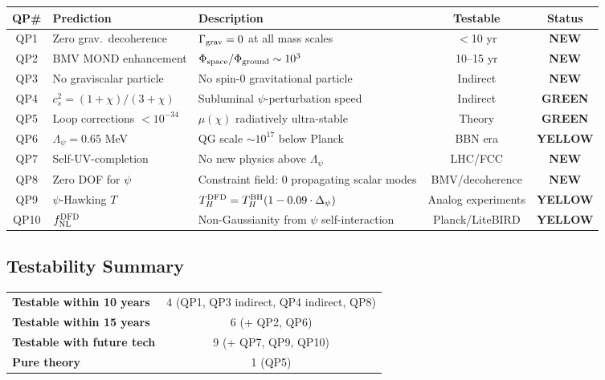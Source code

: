 \documentclass[11pt,a4paper]{article}
\newcommand{\GREEN}{\textcolor{dfdgreen}{\textbf{GREEN}}}
\newcommand{\YELLOW}{\textcolor{dfdyellow}{\textbf{YELLOW}}}
\newcommand{\NEW}{\textcolor{dfdblue}{\textbf{NEW}}}
\begin{document}
\begin{center}
\begin{longtable}{clp{4.5cm}cc}
\toprule
\textbf{QP\#} & \textbf{Prediction} & \textbf{Description} & \textbf{Testable} & \textbf{Status} \\
\midrule
\endfirsthead
QP1 & Zero grav.\ decoherence & $\Gamma_{\rm grav} = 0$ at all mass scales & $<$10 yr & \NEW \\
QP2 & BMV MOND enhancement & $\Phi_{\rm space}/\Phi_{\rm ground} \sim 10^3$ & 10--15 yr & \NEW \\
QP3 & No graviscalar particle & No spin-0 gravitational particle & Indirect & \NEW \\
QP4 & $c_s^2 = (1+\chi)/(3+\chi)$ & Subluminal $\psi$-perturbation speed & Indirect & \GREEN \\
QP5 & Loop corrections $< 10^{-34}$ & $\mu(\chi)$ radiatively ultra-stable & Theory & \GREEN \\
QP6 & $\Lambda_\psi = 0.65$ MeV & QG scale $\sim 10^{17}$ below Planck & BBN era & \YELLOW \\
QP7 & Self-UV-completion & No new physics above $\Lambda_\psi$ & LHC/FCC & \NEW \\
QP8 & Zero DOF for $\psi$ & Constraint field: 0 propagating scalar modes & BMV/decoherence & \NEW \\
QP9 & $\psi$-Hawking $T$ & $T_H^{\rm DFD} = T_H^{\rm BH}(1 - 0.09\cdot\Delta_\psi)$ & Analog experiments & \YELLOW \\
QP10 & $f_{\rm NL}^{\rm DFD}$ & Non-Gaussianity from $\psi$ self-interaction & Planck/LiteBIRD & \YELLOW \\
\bottomrule
\end{longtable}
\end{center}

\subsection{Testability Summary}

\begin{center}
\begin{tabular}{lc}
\toprule
\textbf{Testable within 10 years} & 4 (QP1, QP3 indirect, QP4 indirect, QP8) \\
\textbf{Testable within 15 years} & 6 (+ QP2, QP6) \\
\textbf{Testable with future tech} & 9 (+ QP7, QP9, QP10) \\
\textbf{Pure theory} & 1 (QP5) \\
\bottomrule
\end{tabular}
\end{center}
\end{document}
